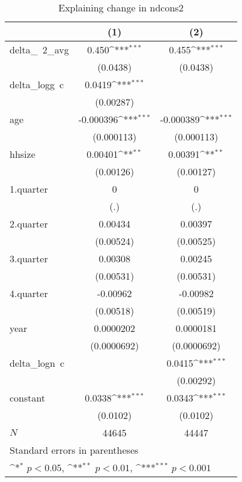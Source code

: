 \begin{table}[htbp]\centering
\def\sym#1{\ifmmode^{#1}\else\(^{#1}\)\fi}
\caption{\label{logndcons2\_deltacons} Explaining change in ndcons2}
\begin{tabular}{l*{2}{c}}
\hline\hline
            &\multicolumn{1}{c}{(1)}         &\multicolumn{1}{c}{(2)}         \\
\hline
delta\_~2\_avg&       0.450\sym{***}&       0.455\sym{***}\\
            &    (0.0438)         &    (0.0438)         \\
delta\_logg~c&      0.0419\sym{***}&                     \\
            &   (0.00287)         &                     \\
age         &   -0.000396\sym{***}&   -0.000389\sym{***}\\
            &  (0.000113)         &  (0.000113)         \\
hhsize      &     0.00401\sym{**} &     0.00391\sym{**} \\
            &   (0.00126)         &   (0.00127)         \\
1.quarter   &           0         &           0         \\
            &         (.)         &         (.)         \\
2.quarter   &     0.00434         &     0.00397         \\
            &   (0.00524)         &   (0.00525)         \\
3.quarter   &     0.00308         &     0.00245         \\
            &   (0.00531)         &   (0.00531)         \\
4.quarter   &    -0.00962         &    -0.00982         \\
            &   (0.00518)         &   (0.00519)         \\
year        &   0.0000202         &   0.0000181         \\
            & (0.0000692)         & (0.0000692)         \\
delta\_logn~c&                     &      0.0415\sym{***}\\
            &                     &   (0.00292)         \\
constant    &      0.0338\sym{***}&      0.0343\sym{***}\\
            &    (0.0102)         &    (0.0102)         \\
\hline
\(N\)       &       44645         &       44447         \\
\hline\hline
\multicolumn{3}{l}{\footnotesize Standard errors in parentheses}\\
\multicolumn{3}{l}{\footnotesize \sym{*} \(p<0.05\), \sym{**} \(p<0.01\), \sym{***} \(p<0.001\)}\\
\end{tabular}
\end{table}
